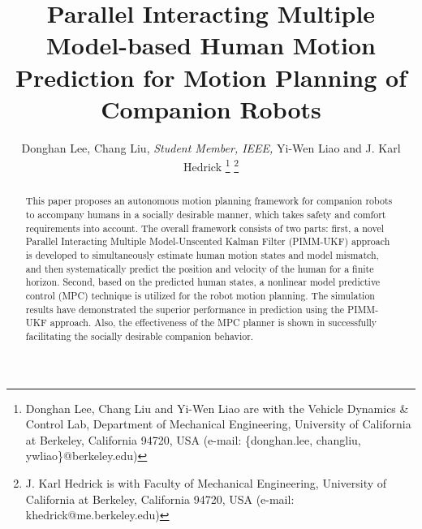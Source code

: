 \documentclass[journal]{IEEEtran}
\title{\LARGE \bf
Parallel Interacting Multiple Model-based Human Motion Prediction for Motion Planning of Companion Robots
}
\author{Donghan Lee, Chang Liu, \textit{Student Member, IEEE,} Yi-Wen Liao and J. Karl Hedrick%
	\thanks{Donghan Lee, Chang Liu and Yi-Wen Liao are with the Vehicle Dynamics \& Control Lab, Department of Mechanical Engineering, University of California at Berkeley, California 94720, USA (e-mail: \{donghan.lee, changliu, ywliao\}@berkeley.edu)}%
	\thanks{J. Karl Hedrick is with Faculty of Mechanical Engineering, University of California at Berkeley, California 94720, USA (e-mail: khedrick@me.berkeley.edu)}%
}
\DeclareRobustCommand{\dhnote}[1]{\ifthenelse{\boolean{include-notes}}%
{\textcolor{blue}{\textbf{DH: #1}}}{}}
\begin{document}
	
	\maketitle
	\thispagestyle{empty}
	\pagestyle{empty}
	
\setlength{\belowcaptionskip}{-1pt} %
	\begin{abstract}
		This paper proposes an autonomous motion planning framework for companion robots to accompany humans in a socially desirable manner, which takes safety and comfort requirements into account.
		The overall framework consists of two parts: first, a novel Parallel Interacting Multiple Model-Unscented Kalman Filter (PIMM-UKF) approach is developed to simultaneously estimate human motion states and model mismatch, and then systematically predict the position and velocity of the human for a finite horizon.
        Second, based on the predicted human states, a nonlinear model predictive control (MPC) technique is utilized for the robot motion planning.
		The simulation results have demonstrated the superior performance in prediction using the PIMM-UKF approach. Also, the effectiveness of the MPC planner is shown in successfully facilitating the socially desirable companion behavior.
	\end{abstract}
    
\end{document}
